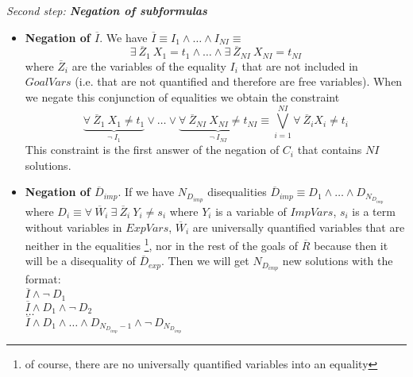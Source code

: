 \documentclass{llncs}
\begin{document}
\noindent
{\em Second step: {\bf Negation of subformulas}}

        \begin{itemize}

           \item {\bf Negation of $\overline{I}$}. We have $\overline{I}
           \equiv I_1 \wedge \ldots \wedge I_{NI} \equiv$ \[ \exists~
           \overline{Z}_1~ X_1 = t_1 \wedge \ldots \wedge \exists~
           \overline{Z}_{NI}~ X_{NI} = t_{NI} \] where
           $\overline{Z}_i$ are the variables of the equality $I_i$ that
           are not included in $GoalVars$ (i.e. that are not quantified
           and therefore are free variables). When we negate this
           conjunction of equalities we obtain the constraint 
                \[
           \underbrace{\forall~ \overline{Z}_1~ X_1 \neq t_1} _{\neg~
           I_1} \vee \ldots \vee \underbrace{\forall~
           \overline{Z}_{NI}~ X_{NI} \neq t_{NI} } _{\neg~ I_{NI}}
           \equiv %
           \bigvee_{i=1}^{NI} \forall~ \overline{Z}_i X_i
           \neq t_i \] 
           This constraint is the first answer of the
           negation of $C_i$ that contains $NI$ solutions.

           \item {\bf Negation of $\overline{D}_{imp}$}. If we have
           $N_{D_{imp}}$ disequalities $\overline{D}_{imp} \equiv D_1
           \wedge \ldots \wedge D_{N_{D_{imp}}}$ where $ D_i \equiv
           \forall~ \overline{W}_i ~ \exists~ \overline{Z}_i ~ Y_i
           \neq s_i$ where $Y_i$ is a variable of $ImpVars$, $s_i$ is
           a term without variables in $ExpVars$, $\overline{W}_i$ are
           universally quantified variables that are neither in the
           equalities \footnote{of course, there are no universally
           quantified variables into an equality}, nor in the rest of
           the goals of $\overline{R}$ because then it will be a
           disequality of $\overline{D}_{exp}$. Then we will get
           $N_{D_{imp}}$ new solutions with the format: \\

           $\overline{I} \wedge \neg~ D_1 $ \\ 
           $\overline{I} \wedge
           D_1 \wedge \neg~ D_2 $ \\ 
           $\ldots $ \\ 
           $\overline{I} \wedge
           D_1 \wedge \ldots \wedge D_{N_{D_{imp}}-1} \wedge \neg~
           D_{N_{D_{imp}}}$ \\ 


\end{itemize}
\end{document}
